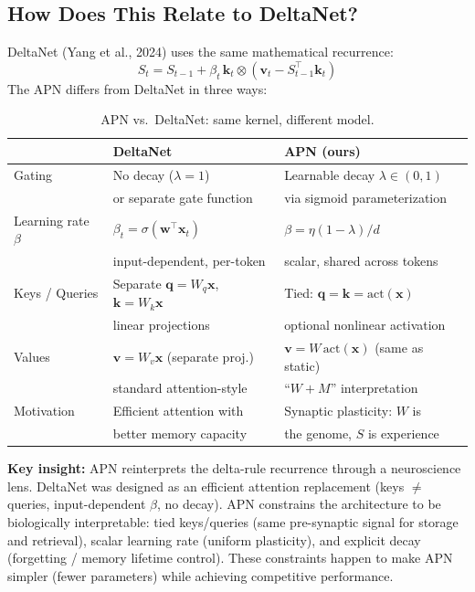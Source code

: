 \documentclass[11pt,a4paper]{article}
\begin{document}
\subsection{How Does This Relate to DeltaNet?}

DeltaNet (Yang et al., 2024) uses the same mathematical recurrence:
\begin{equation}
S_t = S_{t-1} + \beta_t \, \mathbf{k}_t \otimes (\mathbf{v}_t - S_{t-1}^\top \mathbf{k}_t)
\end{equation}
The APN differs from DeltaNet in three ways:

\begin{table}[h]
\centering
\caption{APN vs.\ DeltaNet: same kernel, different model.}
\begin{tabular}{lll}
\toprule
& \textbf{DeltaNet} & \textbf{APN (ours)} \\
\midrule
Gating & No decay ($\lambda = 1$) & Learnable decay $\lambda \in (0,1)$ \\
 & or separate gate function & via sigmoid parameterization \\
\midrule
Learning rate $\beta$ & $\beta_t = \sigma(\mathbf{w}^\top \mathbf{x}_t)$ & $\beta = \eta(1-\lambda)/d$ \\
 & input-dependent, per-token & scalar, shared across tokens \\
\midrule
Keys / Queries & Separate $\mathbf{q} = W_q\mathbf{x}$, $\mathbf{k} = W_k\mathbf{x}$ & Tied: $\mathbf{q} = \mathbf{k} = \text{act}(\mathbf{x})$ \\
 & linear projections & optional nonlinear activation \\
\midrule
Values & $\mathbf{v} = W_v\mathbf{x}$ (separate proj.) & $\mathbf{v} = W\, \text{act}(\mathbf{x})$ (same as static) \\
 & standard attention-style & ``$W + M$'' interpretation \\
\midrule
Motivation & Efficient attention with & Synaptic plasticity: $W$ is \\
 & better memory capacity & the genome, $S$ is experience \\
\bottomrule
\end{tabular}
\end{table}

\textbf{Key insight:} APN reinterprets the delta-rule recurrence through a neuroscience lens.
DeltaNet was designed as an efficient attention replacement (keys $\neq$ queries, input-dependent $\beta$, no decay).
APN constrains the architecture to be biologically interpretable: tied keys/queries (same pre-synaptic signal for storage and retrieval), scalar learning rate (uniform plasticity), and explicit decay (forgetting / memory lifetime control).
These constraints happen to make APN simpler (fewer parameters) while achieving competitive performance.
\end{document}
